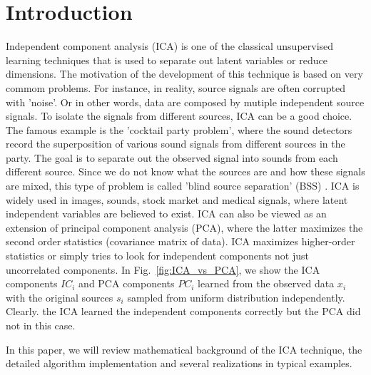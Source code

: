 \documentclass[aps,prl,preprint,superscriptaddress]{revtex4-2}
\begin{document}
\section{Introduction}
Independent component analysis (ICA) is one of the classical unsupervised learning techniques that is used to separate out latent variables or reduce dimensions. The motivation of the development of this technique is based on very commom problems. For instance, in reality, source signals are often corrupted with 'noise'. Or in other words, data are composed by mutiple independent source signals. To isolate the signals from different sources, ICA can be a good choice. The famous example is the 'cocktail party problem', where the sound detectors record the superposition of various sound signals from different sources in the party. The goal is to separate out the observed signal into sounds from each different source. Since we do not know what the sources are and how these signals are mixed, this type of problem is called 'blind source separation' (BSS) \cite{lee1998independent}. ICA is widely used in images, sounds, stock market and medical signals, where latent independent variables are believed to exist. ICA can also be viewed as an extension of principal component analysis (PCA), where the latter maximizes the second order statistics (covariance matrix of data). ICA maximizes higher-order statistics or simply tries to look for independent components not just uncorrelated components. In Fig.~\ref{fig:ICA_vs_PCA}, we show the ICA components $IC_{i}$ and PCA components $PC_{i}$ learned from the observed data $x_{i}$ with the original sources $s_{i}$ sampled from uniform distribution independently. Clearly. the ICA learned the independent components correctly but the PCA did not in this case. 

In this paper, we will review mathematical background of the ICA technique, the detailed algorithm implementation and several realizations in typical examples. 
\end{document}
